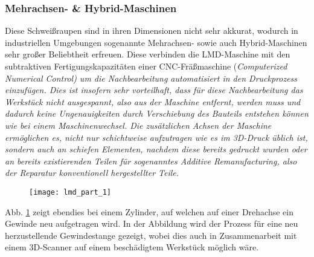 \documentclass[../main.tex]{subfiles}
\begin{document}
\subsubsection{Mehrachsen- \& Hybrid-Maschinen}
Diese Schweißraupen sind in ihren Dimensionen nicht sehr akkurat, wodurch in  industriellen Umgebungen sogenannte Mehrachsen- sowie auch Hybrid-Maschinen sehr großer Beliebtheit erfreuen. Diese verbinden die LMD-Maschine mit den subtraktiven Fertigungskapazitäten einer CNC-Fräßmaschine (\it{Computerized Numerical Control}) um die Nachbearbeitung automatisiert in den Druckprozess einzufügen. Dies ist insofern sehr vorteilhaft, dass für diese Nachbearbeitung das Werkstück nicht ausgespannt, also aus der Maschine entfernt, werden muss und dadurch keine Ungenauigkeiten durch Verschiebung des Bauteils entstehen können wie bei einem Maschinenwechsel.
Die zusätzlichen Achsen der Maschine ermöglichen es, nicht nur schichtweise aufzutragen wie es im 3D-Druck üblich ist, sondern auch an schiefen Elementen, nachdem diese bereits gedruckt wurden oder an bereits existierenden Teilen für sogenanntes Additive Remanufacturing, also der Reparatur konventionell hergestellter Teile. \parencite{ALL3D_2}
\begin{figure}[h]
	\begin{center}
	\texttt{[image: lmd\_part\_1]}	
		\label{img:lmd_part_1}
	\end{center}
	
\end{figure}
Abb. \ref{img:lmd_part_1} zeigt ebendies bei einem Zylinder, auf welchen auf einer Drehachse ein Gewinde neu aufgetragen wird. In der Abbildung wird der Prozess für eine neu herzustellende Gewindestange gezeigt, wobei dies auch in Zusammenarbeit mit einem 3D-Scanner auf einem beschädigtem Werkstück möglich wäre. 
\end{document}
